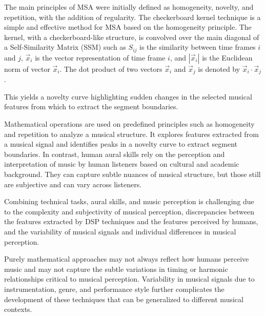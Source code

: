 The main principles of MSA were initially defined as homogeneity, novelty, and repetition, with the addition of regularity. The checkerboard kernel technique is a simple and effective method for MSA based on the homogeneity principle. The kernel, with a checkerboard-like structure, is convolved over the main diagonal of a Self-Similarity Matrix (SSM) such as $S_{ij}$ is the similarity between time frames $i$ and $j$, $\vec{x}_i$ is the vector representation of time frame $i$, and $\left| \vec{x}_i \right|$ is the Euclidean norm of vector $\vec{x}_i$. The dot product of two vectors $\vec{x}_i$ and $\vec{x}_j$ is denoted by $\vec{x}_i \cdot \vec{x}_j$.



This yields a novelty curve highlighting sudden changes in the selected musical features from which to extract the segment boundaries.



Mathematical operations are used on predefined principles such as homogeneity and repetition to analyze a musical structure. It explores features extracted from a musical signal and identifies peaks in a novelty curve to extract segment boundaries. In contrast, human aural skills rely on the perception and interpretation of music by human listeners based on cultural and academic background. They can capture subtle nuances of musical structure, but those still are subjective and can vary across listeners.

Combining technical tasks, aural skills, and music perception is challenging due to the complexity and subjectivity of musical perception, discrepancies between the features extracted by DSP techniques and the features perceived by humans, and the variability of musical signals and individual differences in musical perception. 

Purely mathematical approaches may not always reflect how humans perceive music and may not capture the subtle variations in timing or harmonic relationships critical to musical perception. Variability in musical signals due to instrumentation, genre, and performance style further complicates the development of these techniques that can be generalized to different musical contexts.